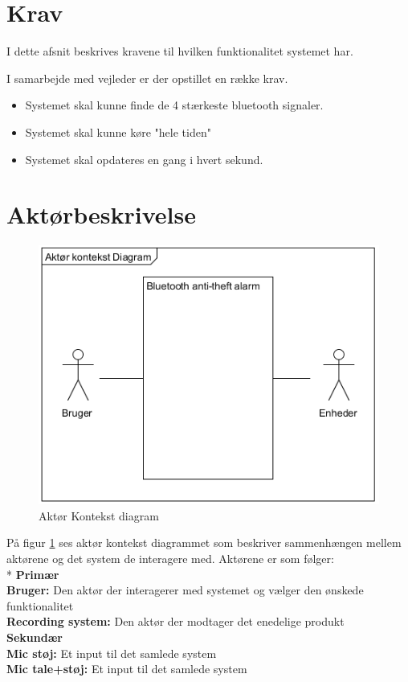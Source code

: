\graphicspath{{Chapters/Krav/}}


\section{Krav}
I dette afsnit beskrives kravene til hvilken funktionalitet systemet har. 


I samarbejde med vejleder er der opstillet en række krav.
\begin{itemize}
\item Systemet skal kunne finde de 4 stærkeste bluetooth signaler. 
\item Systemet skal kunne køre "hele tiden"
\item Systemet skal opdateres en gang i hvert sekund.  
\end{itemize}

\section{Aktørbeskrivelse}

\begin{figure}[H]
	\centering
	\includegraphics[width = 200 pt]{Img/Aktoer_Kontekst.png}
	\caption{Aktør Kontekst diagram}
	\label{fig:Aktoer Kontekst diagram}
\end{figure}

På figur \ref{fig:Aktoer Kontekst diagram} ses aktør kontekst diagrammet som beskriver sammenhængen mellem aktørene og det system de interagere med. Aktørene er som følger: \\*
\textbf{Primær}\\
\textbf{Bruger:} Den aktør der interagerer med systemet og vælger den ønskede funktionalitet \\
\textbf{Recording system:} Den aktør der modtager det enedelige produkt\\
\textbf{Sekundær}\\
\textbf{Mic støj:} Et input til det samlede system\\
\textbf{Mic tale+støj:} Et input til det samlede system \\

